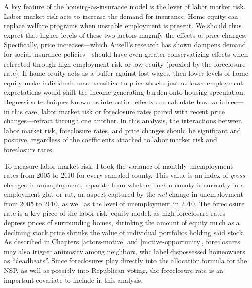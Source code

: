 \documentclass[12pt,oneside]{psthesis}
\begin{document}
A key feature of the housing-as-insurance model is the lever of labor market risk.
Labor market risk acts to increase the demand for insurance.
Home equity can replace welfare programs when unstable employment is present.
We should thus expect that higher levels of these two factors magnify the effects of price changes.
Specifically, price increases---which Ansell's research has shown dampens demand for social insurance policies---should have even greater conservatizing effects when refracted through high employment risk or low equity (proxied by the foreclosure rate).
If home equity acts as a buffer against lost wages, then lower levels of home equity make individuals more sensitive to price shocks just as lower employment expectations would shift the income-generating burden onto housing speculation.
Regression techniques known as interaction effects can calculate how variables---in this case, labor market risk or foreclosure rates paired with recent price changes---refract through one another.
In this analysis, the interactions between labor market risk, foreclosure rates, and price changes should be significant and positive, regardless of the coefficients attached to labor market risk and foreclosure rates.

To measure labor market risk, I took the variance of monthly unemployment rates from 2005 to 2010 for every sampled county.
This value is an index of \emph{gross} changes in unemployment, separate from whether such a county is currently in a employment glut or rut, an aspect captured by the \emph{net} change in unemployment from 2005 to 2010, as well as the level of unemployment in 2010.
The foreclosure rate is a key piece of the labor risk--equity model, as high foreclosure rates depress prices of surrounding homes, shrinking the amount of equity much as a declining stock price shrinks the value of individual portfolios holding said stock.
As described in Chapters \ref{actors-motive} and \ref{motive-opportunity}, foreclosures may also trigger animosity among neighbors, who label dispossessed homeowners as ``deadbeats''.
Since foreclosures play directly into the allocation formula for the NSP, as well as possibly into Republican voting, the foreclosure rate is an important covariate to include in this analysis.
\end{document}

